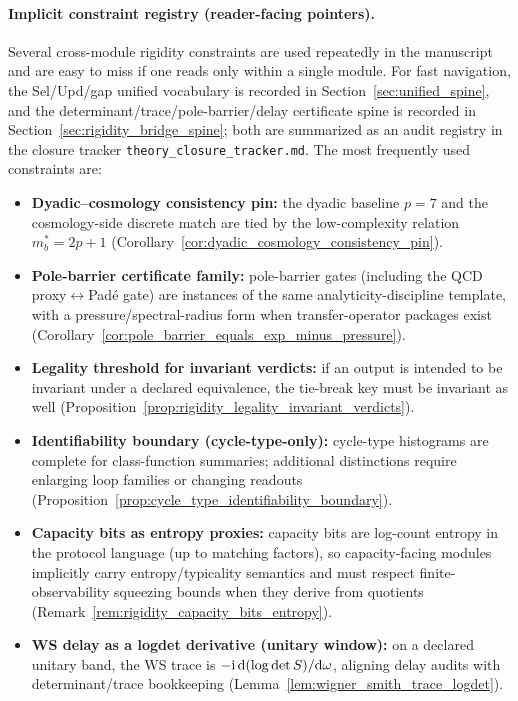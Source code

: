 \paragraph{Implicit constraint registry (reader-facing pointers).}
\AuditTag Several cross-module rigidity constraints are used repeatedly in the manuscript and are easy to miss if one reads only within a single module.
For fast navigation, the \AuditTag Sel/Upd/gap unified vocabulary is recorded in Section~\ref{sec:unified_spine}, and the determinant/trace/pole-barrier/delay certificate spine is recorded in Section~\ref{sec:rigidity_bridge_spine}; both are summarized as an audit registry in the closure tracker \texttt{theory\_closure\_tracker.md}.
The most frequently used constraints are:
\begin{itemize}
\item \AuditTag \textbf{Dyadic--cosmology consistency pin:} the dyadic baseline $p=7$ and the cosmology-side discrete match are tied by the low-complexity relation $m_b^\ast=2p+1$ (Corollary~\ref{cor:dyadic_cosmology_consistency_pin}).
\item \AuditTag \textbf{Pole-barrier certificate family:} pole-barrier gates (including the QCD proxy$\leftrightarrow$Pad\'e gate) are instances of the same analyticity-discipline template, with a pressure/spectral-radius form when transfer-operator packages exist (Corollary~\ref{cor:pole_barrier_equals_exp_minus_pressure}).
\item \AuditTag \textbf{Legality threshold for invariant verdicts:} if an output is intended to be invariant under a declared equivalence, the tie-break key must be invariant as well (Proposition~\ref{prop:rigidity_legality_invariant_verdicts}).
\item \AuditTag \textbf{Identifiability boundary (cycle-type-only):} cycle-type histograms are complete for class-function summaries; additional distinctions require enlarging loop families or changing readouts (Proposition~\ref{prop:cycle_type_identifiability_boundary}).
\item \AuditTag \textbf{Capacity bits as entropy proxies:} capacity bits are log-count entropy in the protocol language (up to matching factors), so capacity-facing modules implicitly carry entropy/typicality semantics and must respect finite-observability squeezing bounds when they derive from quotients (Remark~\ref{rem:rigidity_capacity_bits_entropy}).
\item \AuditTag \textbf{WS delay as a logdet derivative (unitary window):} on a declared unitary band, the WS trace is $-\mathrm{i}\,\mathrm{d}(\log\det S)/\mathrm{d}\omega$, aligning delay audits with determinant/trace bookkeeping (Lemma~\ref{lem:wigner_smith_trace_logdet}).

\end{itemize}
